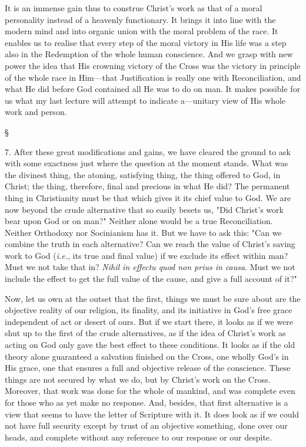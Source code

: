 \documentclass[12pt,letterpaper,oneside]{book}
\begin{document}
It is an immense gain thus to construe 
Christ's work as that of a moral personality 
instead of a heavenly functionary. It brings 
it into line with the modern mind and into 
organic union with the moral problem of 
the race. It enables us to realise that every 
step of the moral victory in His life was a step 
also in the Redemption of the whole human 
conscience. And we grasp with new power the 
idea that His crowning victory of the Cross was 
the victory in principle of the whole race in 
Him---that Justification is really one with Reconciliation, 
and what He did before God contained 
all He was to do on man. It makes 
possible for us what my last lecture will attempt 
to indicate a---unitary view of His whole work 
and person. 

\begin{center}
\S
\end{center}

7. After these great modifications and gains, 
we have cleared the ground to ask with some 
exactness just where the question at the moment 
stands. What was the divinest thing, the atoning, 
satisfying thing, the thing offered to God, in 
Christ; the thing, therefore, final and precious in 
what He did? The permanent thing in Christianity 
must be that which gives it its chief 
value to God. We are now beyond the crude 
alternative that so easily besets us, "Did Christ's 
work bear upon God or on man?" Neither alone 
would be a true Reconciliation. Neither Orthodoxy 
nor Socinianism has it. But we have to ask 
this: "Can we combine the truth in each alternative? 
Can we reach the value of Christ's 
saving work to God (\textit{i.e.}, its true and final value) 
if we exclude its effect within man? Must we 
not take that in? \textit{Nihil in effectu quod non prius 
in causa}. Must we not include the effect to get 
the full value of the cause, and give a full 
account of it?" 

Now, let us own at the outset that the first, 
things we must be sure about are the objective 
reality of our religion, its finality, and its initiative 
in God's free grace independent of act or 
desert of ours. But if we start there, it looks 
as if we were shut up to the first of the crude 
alternatives, as if the idea of Christ's work as 
acting on God only gave the best effect to these 
conditions. It looks as if the old theory alone 
guaranteed a salvation finished on the Cross, one 
wholly God's in His grace, one that ensures a 
full and objective release of the conscience. 
These things are not secured by what we do, but 
by Christ's work on the Cross. Moreover, that 
work was done for the whole of mankind, and 
was complete even for those who as yet make no 
response. And, besides, that first alternative is 
a view that seems to have the letter of Scripture 
with it. It does look as if we could not have full 
security except by trust of an objective something, 
done over our heads, and complete without 
any reference to our response or our 
despite. 
\end{document}

